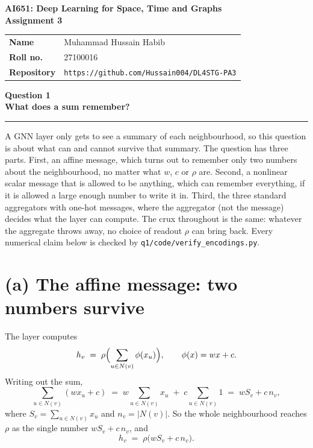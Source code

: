 \documentclass[11pt,letterpaper]{article}
\newcommand{\taskbanner}[2]{\begin{center}{\small\bfseries #1}\\[3pt]{\Large\bfseries #2}\end{center}\vspace{2pt}\hrule\vspace{8pt}}
\begin{document}
\begin{center}
  {\small\bfseries AI651: Deep Learning for Space, Time and Graphs}\\[6pt]
  {\Large\bfseries Assignment 3}\\[6pt]
\end{center}

\vspace{2pt}
\noindent\begin{tabular}{@{}p{0.8in}p{5.6in}@{}}
\textbf{Name}      & Muhammad Hussain Habib \\
\textbf{Roll no.}  & 27100016 \\
\textbf{Repository} & \texttt{https://github.com/Hussain004/DL4STG-PA3} \\
\end{tabular}

\vspace{6pt}
\normalsize

\taskbanner{Question 1}{What does a sum remember?}

A GNN layer only gets to see a summary of each neighbourhood, so this question is about
what can and cannot survive that summary. The question has three parts. First, an affine
message, which turns out to remember only two numbers about the neighbourhood, no matter
what $w$, $c$ or $\rho$ are. Second, a nonlinear scalar message that is allowed to be anything,
which can remember everything, if it is allowed a large enough number to write it in. Third,
the three standard aggregators with one-hot messages, where the aggregator (not the message)
decides what the layer can compute. The crux throughout is the same: whatever the aggregate
throws away, no choice of readout $\rho$ can bring back. Every numerical claim below is
checked by \texttt{q1/code/verify\_encodings.py}.

\section*{(a) The affine message: two numbers survive}

The layer computes
\begin{equation*}
h_v \;=\; \rho\Bigl(\sum_{u \in N(v)} \phi(x_u)\Bigr),
\qquad \phi(x) = wx + c .
\end{equation*}
Writing out the sum,
\begin{equation*}
\sum_{u \in N(v)} (w x_u + c)
\;=\;
w \sum_{u \in N(v)} x_u \;+\; c \sum_{u \in N(v)} 1
\;=\;
w S_v + c\, n_v ,
\end{equation*}
where $S_v = \sum_{u \in N(v)} x_u$ and $n_v = |N(v)|$. So the whole neighbourhood reaches
$\rho$ as the single number $w S_v + c\, n_v$, and
\begin{equation*}
h_v \;=\; \rho\bigl(w S_v + c\, n_v\bigr).
\end{equation*}
\end{document}
